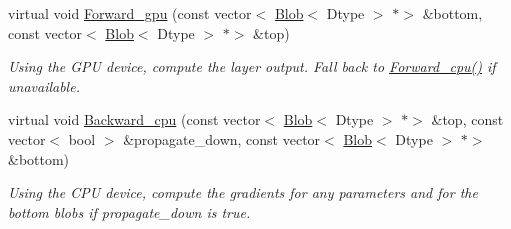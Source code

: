 \begin{DoxyCompactItemize}
\item 
\mbox{\label{classcaffe_1_1_recurrent_layer_afb4cdbb38b24d2a2ccb14cebc4e1018b}} 
virtual void \mbox{\hyperlink{classcaffe_1_1_recurrent_layer_afb4cdbb38b24d2a2ccb14cebc4e1018b}{Forward\+\_\+gpu}} (const vector$<$ \mbox{\hyperlink{classcaffe_1_1_blob}{Blob}}$<$ Dtype $>$ $\ast$$>$ \&bottom, const vector$<$ \mbox{\hyperlink{classcaffe_1_1_blob}{Blob}}$<$ Dtype $>$ $\ast$$>$ \&top)
\begin{DoxyCompactList}\small\item\em Using the G\+PU device, compute the layer output. Fall back to \mbox{\hyperlink{classcaffe_1_1_recurrent_layer_a9f0e34d7534fac027c640e66f55a18d2}{Forward\+\_\+cpu()}} if unavailable. \end{DoxyCompactList}\item 
\mbox{\label{classcaffe_1_1_recurrent_layer_a931f71a51255e488b45c407d5298871d}} 
virtual void \mbox{\hyperlink{classcaffe_1_1_recurrent_layer_a931f71a51255e488b45c407d5298871d}{Backward\+\_\+cpu}} (const vector$<$ \mbox{\hyperlink{classcaffe_1_1_blob}{Blob}}$<$ Dtype $>$ $\ast$$>$ \&top, const vector$<$ bool $>$ \&propagate\+\_\+down, const vector$<$ \mbox{\hyperlink{classcaffe_1_1_blob}{Blob}}$<$ Dtype $>$ $\ast$$>$ \&bottom)
\begin{DoxyCompactList}\small\item\em Using the C\+PU device, compute the gradients for any parameters and for the bottom blobs if propagate\+\_\+down is true. \end{DoxyCompactList}\end{DoxyCompactItemize}
